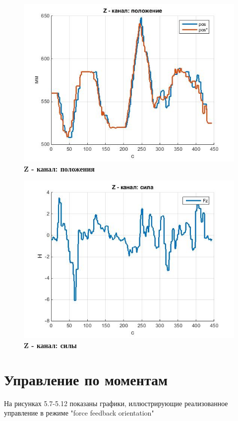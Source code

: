 \documentclass[a4paper,14pt,russian]{extreport} \usepackage{extsizes}
\begin{document}
			\begin{figure}[h!]
				\centering		 
				\includegraphics[width=5.5in]{./graph/posZ.jpg}	
				\caption{
					\textbf{Z - канал: положения}
				}
				\label{fig_img45}
			\end{figure}
			\begin{figure}[h!]
				\centering		 
				\includegraphics[width=5.5in]{./graph/powZ.jpg}	
				\caption{
					\textbf{Z - канал: силы}
				}
				\label{fig_img46}
			\end{figure}
			\section{Управление по моментам}
			На рисунках 5.7-5.12 показаны графики, иллюстрирующие реализованное управление в режиме "force feedback orientation"
			
\end{document}
